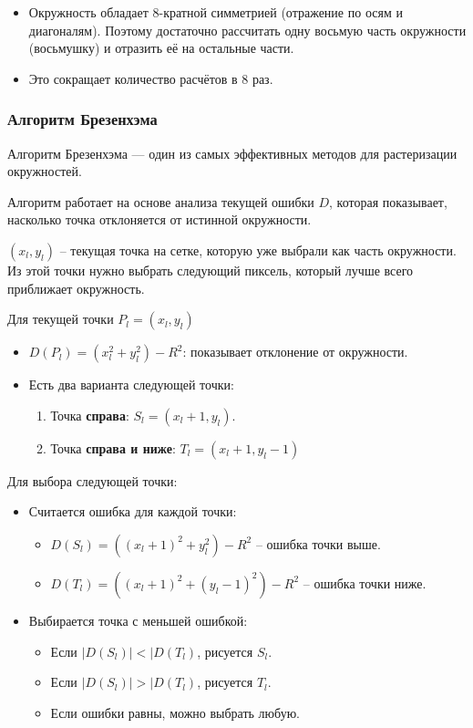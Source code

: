 \begin{itemize}
    \item Окружность обладает 8-кратной симметрией (отражение по осям и диагоналям). Поэтому достаточно рассчитать одну восьмую часть окружности (восьмушку) и отразить её на остальные части.
    \item Это сокращает количество расчётов в 8 раз.
\end{itemize}

\subsubsection*{Алгоритм Брезенхэма}
Алгоритм Брезенхэма — один из самых эффективных методов для растеризации окружностей.

Алгоритм работает на основе анализа текущей ошибки $D$, которая показывает, насколько точка отклоняется от истинной окружности.

$(x_l, y_l)$ -- текущая точка на сетке, которую уже выбрали как часть окружности.
Из этой точки нужно выбрать следующий пиксель, который лучше всего приближает окружность.

Для текущей точки $P_l = (x_l, y_l)$
\begin{itemize}
    \item $D(P_l) = (x_l^2 + y_l^2) - R^2$: показывает отклонение от окружности.
    \item Есть два варианта следующей точки:
          \begin{enumerate}
              \item Точка \textbf{справа}: $S_l = (x_l + 1, y_l)$.
              \item Точка \textbf{справа и ниже}: $T_l = (x_l + 1, y_l - 1)$
          \end{enumerate}
\end{itemize}

Для выбора следующей точки:
\begin{itemize}
    \item Считается ошибка для каждой точки:
          \begin{itemize}
              \item $D(S_l) = ((x_l + 1)^2 + y_l^2) - R^2$ -- ошибка точки выше.
              \item $D(T_l) = ((x_l + 1)^2 + (y_l - 1)^2) - R^2$ -- ошибка точки ниже.
          \end{itemize}
    \item Выбирается точка с меньшей ошибкой:
          \begin{itemize}
              \item Если $|D(S_l)| < |D(T_l)$, рисуется $S_l$.
              \item Если $|D(S_l)| > |D(T_l)$, рисуется $T_l$.
              \item Если ошибки равны, можно выбрать любую.
          \end{itemize}
\end{itemize}

